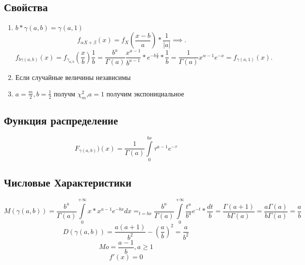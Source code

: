 \documentclass[14pt]{extarticle}
\begin{document}
 \subsection{Свойства}
  \begin{enumerate}
 	\item $b * \gamma(a,b) = \gamma(a,1)$ 
	\[
	f_{\alpha X + \beta}(x) = f_{X}( \frac{x -  b}{a} )*\frac{1}{|a|} \implies
	.\] 
	\[
		f_{b \gamma(a,b)}(x) = f_{\gamma_{a,b}}(\frac{x}{b})\frac{1}{b} = \frac{b^{a}}{\Gamma(a)} \frac{x^{a -1}}{b^{a-1} }*e^{-b \frac{x}{b}} * \frac{1}{b} = \frac{1}{\Gamma(a)} x^{\alpha-1}e^{-x} = f_{\gamma(a,1)}(x)
	.\] 
\item Если случайные величины независимы
\item $a = \frac{m}{2},b = \frac{1}{2}$ получм $\chi^{2}_{m}$,$a =1$ получим экспонициальное
 \end{enumerate}
 \subsection{Функция распределение}
 \begin{equation}
 	F_{\gamma(a,b)}) (x) = \frac{1}{\Gamma(a)} \int\limits_{0}^{bx}   \tau^{a - 1} e^{-\tau}
 \end{equation}
 \subsection{Числовые Характеристики}
 \begin{equation}
 	M(\gamma(a,b)) = \frac{b^{a}}{\Gamma(a)} \int\limits_{0}^{+\infty} x * x^{a-1}  e^{-bx} dx =_{t=bx} \frac{b^{a}}{\Gamma(a)}\int\limits_{0}^{+\infty}   \frac{t^{a}}{b^{a}} e^{-t} * \frac{dt}{b} = \frac{\Gamma(a+1)}{b\Gamma(a)} = \frac{a \Gamma(a)}{b \Gamma(a)}= \frac{a}{b}
 \end{equation}
 \begin{equation}
 	D(\gamma(a,b)) = \frac{a(a+1)}{b^{2}} - (\frac{a}{b})^{2}=
	\frac{a}{b^2}
 \end{equation}
 \begin{equation}
 	Mo = \frac{a - 1}{b} ,a\ge 1
 \end{equation}
 \begin{equation}
 	f'(x) = 0
 \end{equation}
\end{document}
